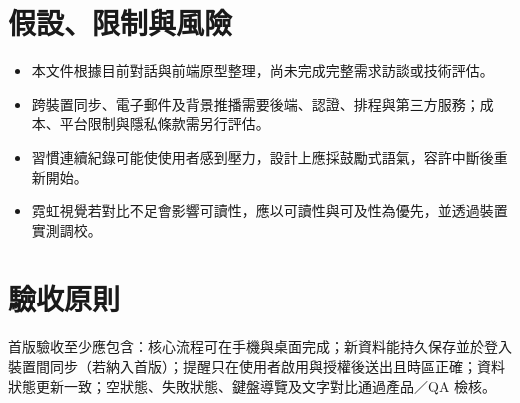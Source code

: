 \documentclass[12pt]{article}
\begin{document}
\section{假設、限制與風險}
\begin{itemize}
\item 本文件根據目前對話與前端原型整理，尚未完成完整需求訪談或技術評估。
\item 跨裝置同步、電子郵件及背景推播需要後端、認證、排程與第三方服務；成本、平台限制與隱私條款需另行評估。
\item 習慣連續紀錄可能使使用者感到壓力，設計上應採鼓勵式語氣，容許中斷後重新開始。
\item 霓虹視覺若對比不足會影響可讀性，應以可讀性與可及性為優先，並透過裝置實測調校。
\end{itemize}
\section{驗收原則}
首版驗收至少應包含：核心流程可在手機與桌面完成；新資料能持久保存並於登入裝置間同步（若納入首版）；提醒只在使用者啟用與授權後送出且時區正確；資料狀態更新一致；空狀態、失敗狀態、鍵盤導覽及文字對比通過產品／QA 檢核。
\end{document}

